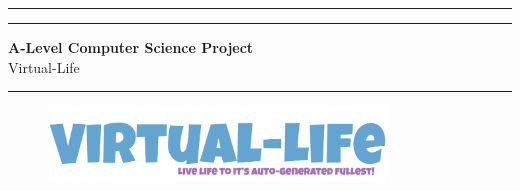 \begin{titlepage} %
	
	\centering %
	
	
	\rule{\textwidth}{1pt} %
	
	\vspace{2pt}\vspace{-\baselineskip} %
	
	\rule{\textwidth}{0.4pt} %
	
	\vspace{0.1\textheight} %
	

	{\Huge \textbf{A-Level Computer Science Project}}\\[0.5\baselineskip] %
	{\Huge Virtual-Life} %

	
	\vspace{0.025\textheight} %
	
	\rule{0.3\textwidth}{0.4pt} %

	
	\vspace{0.05\textheight} %
	
    \begin{figure}[H]
        \centering
        \includegraphics[width=0.8\textwidth]{images/Logo - full.png}
    \end{figure}


    \vspace{0.1\textheight} %

	

\end{titlepage}
